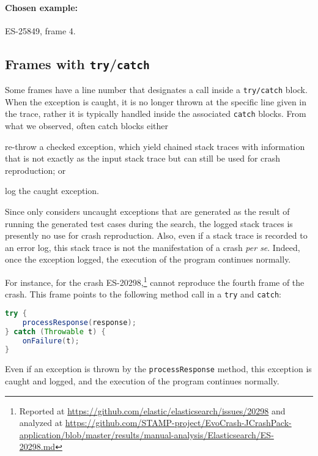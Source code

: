 \paragraph{Chosen example:} 
ES-25849, frame 4.

\subsection{Frames with \texttt{try}/\texttt{catch}}

Some frames have a line number that designates a call inside a \texttt{try/catch} block.
When the exception is caught, it is no longer thrown at the specific line given in the trace, rather it is typically handled inside the associated \texttt{catch} blocks.
From what we observed, often catch blocks either
\begin{inparaenum}[(i)]
\item re-throw a checked exception, which yield chained stack traces with information that is not exactly as the input stack trace but can still be used for crash reproduction;
 or \item log the caught exception.
\end{inparaenum}
%
Since \evocrash only considers uncaught exceptions that are generated as the result of running the generated test cases during the search, the logged stack traces is presently no use for crash reproduction. Also, even if a stack trace is recorded to an error log, this stack trace is not the manifestation of a crash \textit{per se}. Indeed, once the exception logged, the execution of the program continues normally. 

For instance, for the crash ES-20298,\footnote{Reported at \url{https://github.com/elastic/elasticsearch/issues/20298} and analyzed at \url{https://github.com/STAMP-project/EvoCrash-JCrashPack-application/blob/master/results/manual-analysis/Elasticsearch/ES-20298.md}} \evocrash cannot reproduce the fourth frame of the crash. This frame points to the following method call in a \texttt{try} and \texttt{catch}:
%
\begin{lstlisting}[language=Java]
try {
    processResponse(response);
} catch (Throwable t) {
    onFailure(t);
}
\end{lstlisting}
%
Even if an exception is thrown by the \texttt{processResponse} method, this exception is caught and logged, and the execution of the program continues normally. 

